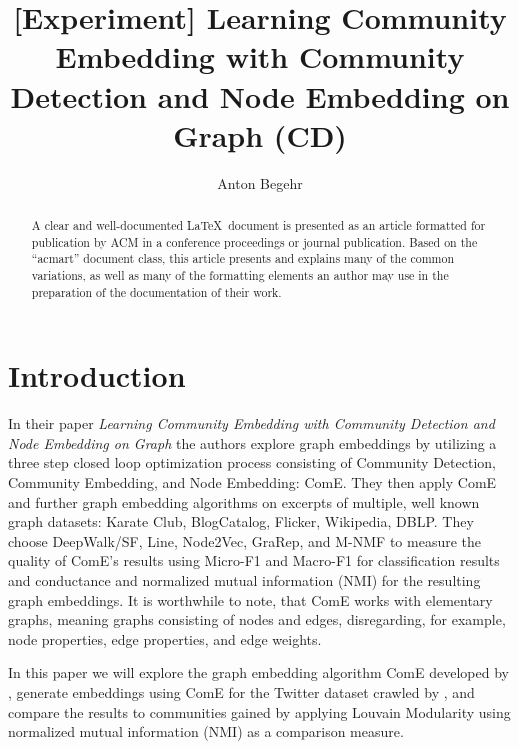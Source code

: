 \documentclass[sigconf]{acmart}
\begin{document}
\title{[Experiment] Learning Community Embedding with Community Detection and Node Embedding on Graph (CD)}

\author{Anton Begehr}


\begin{abstract}
  A clear and well-documented \LaTeX\ document is presented as an
  article formatted for publication by ACM in a conference proceedings
  or journal publication. Based on the ``acmart'' document class, this
  article presents and explains many of the common variations, as well
  as many of the formatting elements an author may use in the
  preparation of the documentation of their work.
\end{abstract}


\maketitle

\section{Introduction}

In their \citeyear{Cav17} paper \textit{Learning Community Embedding with Community Detection and Node Embedding on Graph} the authors \citeauthor{Cav17} explore graph embeddings by utilizing a three step closed loop optimization process consisting of Community Detection, Community Embedding, and Node Embedding: ComE.\cite{Cav17} They then apply ComE and further graph embedding algorithms on excerpts of multiple, well known graph datasets: Karate Club, BlogCatalog, Flicker, Wikipedia, DBLP. They choose DeepWalk/SF, Line, Node2Vec, GraRep, and M-NMF to measure the quality of ComE's results using Micro-F1 and Macro-F1 for classification results and conductance and normalized mutual information (NMI) for the resulting graph embeddings. It is worthwhile to note, that ComE works with elementary graphs, meaning graphs consisting of nodes and edges, disregarding, for example, node properties, edge properties, and edge weights.

In this paper we will explore the graph embedding algorithm ComE developed by \citeauthor{Cav17}, generate embeddings using ComE for the Twitter dataset \cite{TwitterData} crawled by \citeauthor{TwitterData}, and compare the results to communities gained by applying Louvain Modularity using normalized mutual information (NMI) as a comparison measure.
\end{document}
